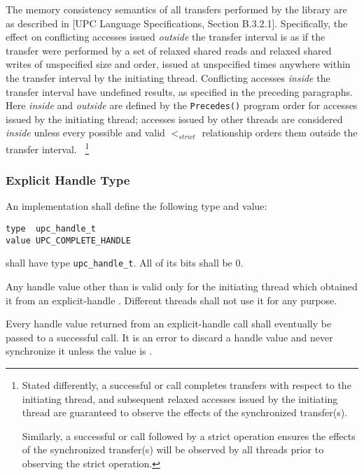 \np The memory consistency semantics of all transfers performed by the library are as described in 
[UPC Language Specifications, Section B.3.2.1]. Specifically, the effect on
conflicting accesses issued {\em outside} the transfer interval is as if the transfer were
performed by a set of relaxed shared reads and relaxed shared writes of
unspecified size and order, issued at unspecified times anywhere within the transfer
interval by the initiating thread. Conflicting accesses {\em inside} the transfer interval
have undefined results, as specified in the preceding paragraphs.  
Here {\em inside} and {\em outside} are defined by the {\tt Precedes()} program order for 
accesses issued by the initiating thread; accesses issued by other threads are considered {\em inside} 
unless every possible and valid $<_{strict}$ relationship orders them outside the transfer interval.~%
\footnote{
Stated differently, a successful \sync or \synci call completes transfers with respect 
to the initiating thread, and subsequent relaxed accesses issued by the initiating thread
are guaranteed to observe the effects of the synchronized transfer(s).

Similarly, a successful \sync or \synci call followed by a strict operation 
ensures the effects of the synchronized transfer(s) will be observed by all 
threads prior to observing the strict operation.  
}

\newpage
\subsubsection{Explicit Handle Type}
\npf An implementation shall define the following type and value:

\begin{verbatim}
type  upc_handle_t
value UPC_COMPLETE_HANDLE
\end{verbatim}

\np \complete shall have type {\tt upc\_handle\_t}.  All of its bits shall be 0.

\np Any handle value other than \complete is valid only for the initiating thread which 
obtained it from an explicit-handle \TIF.
Different threads shall not use it for any purpose.

\np Every handle value returned from an explicit-handle \TIF call shall eventually be passed to
a successful \sync call.  It is an error to discard a handle value and never
synchronize it unless the value is \complete. 

